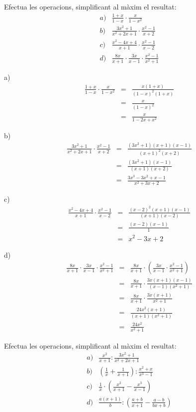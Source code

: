 \begin{exercici}
Efectua les operacions, simplificant al màxim el
resultat:\[
\begin{array}{ll}
a) & \frac{1+x}{1-x}\cdot \frac{x}{1-x^{2}} \\
b) & \frac{3x^{2}+1}{x^{2}+2x+1}\cdot \frac{x^{2}-1}{x+2} \\
c) & \frac{x^{2}-4x+4}{x+1}\cdot \frac{x^{2}-1}{x-2} \\
d) & \frac{8x}{x+1}\cdot \frac{3x}{x-1}\cdot \frac{x^{2}-1}{x^{2}+1}\end{array}\]
\end{exercici}

\begin{solucio}
a)\begin{eqnarray*}
\frac{1+x}{1-x}\cdot \frac{x}{1-x^{2}} &=&\frac{x(1+x)}{(1-x)^{2}(1+x)} \\
&=&\frac{x}{(1-x)^{2}} \\
&=&\frac{x}{1-2x+x^{2}}
\end{eqnarray*}

b)\begin{eqnarray*}
\frac{3x^{2}+1}{x^{2}+2x+1}\cdot \frac{x^{2}-1}{x+2} &=&\frac{(3x^{2}+1)(x+1)(x-1)}{(x+1)^{2}(x+2)} \\
&=&\frac{(3x^{2}+1)(x-1)}{(x+1)(x+2)} \\
&=&\frac{3x^{3}-3x^{2}+x-1}{x^{2}+3x+2}
\end{eqnarray*}

c)\begin{eqnarray*}
\frac{x^{2}-4x+4}{x+1}\cdot \frac{x^{2}-1}{x-2} &=&\frac{(x-2)^{2}(x+1)(x-1)}{(x+1)(x-2)} \\
&=&\frac{(x-2)(x-1)}{1} \\
&=&x^{2}-3x+2
\end{eqnarray*}

d)\begin{eqnarray*}
\frac{8x}{x+1}\cdot \frac{3x}{x-1}\cdot \frac{x^{2}-1}{x^{2}+1} &=&\frac{8x}{x+1}\cdot \left( \frac{3x}{x-1}\cdot \frac{x^{2}-1}{x^{2}+1}\right) \\
&=&\frac{8x}{x+1}\cdot \frac{3x(x+1)(x-1)}{(x-1)(x^{2}+1)} \\
&=&\frac{8x}{x+1}\cdot \frac{3x(x+1)}{x^{2}+1} \\
&=&\frac{24x^{2}(x+1)}{(x+1)(x^{2}+1)} \\
&=&\frac{24x^{2}}{x^{2}+1}
\end{eqnarray*}
\end{solucio}

\begin{exercici}
Efectua les operacions, simplificant al màxim el
resultat:\[
\begin{array}{ll}
a) & \frac{x^{2}}{x+1}:\frac{3x^{2}+1}{x^{2}+2x+1} \\
b) & \left( \frac{1}{x}+\frac{1}{x+1}\right):\frac{x^{2}+x}{x^{3}-1} \\
c) & \frac{1}{x}\cdot \left( \frac{x^{2}}{x+1}-\frac{x^{3}}{x-1}\right) \\
d) & \frac{a(x+1)}{b}:\left( \frac{a+b}{x+1}-\frac{a-b}{bx+b}\right)\end{array}\]
\end{exercici}

